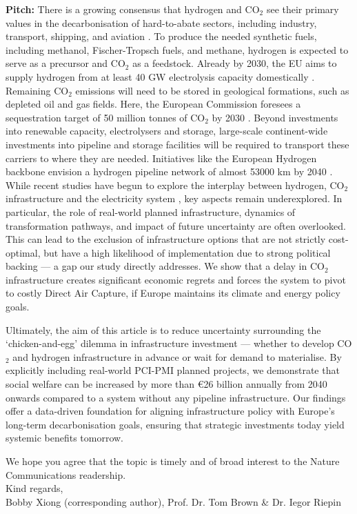 \documentclass[10pt,a4paper,roman]{moderncv}        %
\begin{document}
\textbf{Pitch:} 
There is a growing consensus that hydrogen and CO$_2$ see their primary values in the decarbonisation of hard-to-abate sectors, including industry, transport, shipping, and aviation \cite{vangreevenbroekLittleLoseCase2025,reigstadMovingLowcarbonHydrogen2022,cerniauskasOptionsNaturalGas2020}. To produce the needed synthetic fuels, including methanol, Fischer-Tropsch fuels, and methane, hydrogen is expected to serve as a precursor and CO$_2$ as a feedstock. Already by 2030, the EU aims to supply hydrogen from at least 40 GW electrolysis capacity domestically \cite{europeancommissionCommunicationCommissionEuropean2020,europeancommissionREPowerEUPlanCommunication2022,europeanparliamentRegulationEU20242024}. Remaining CO$_2$ emissions will need to be stored in geological formations, such as depleted oil and gas fields. Here, the European Commission foresees a sequestration target of 50 million tonnes of CO$_2$ by 2030 \cite{europeancommissionREPowerEUPlanCommunication2022}. Beyond investments into renewable capacity, electrolysers and storage, large-scale continent-wide investments into pipeline and storage facilities will be required to transport these carriers to where they are needed. Initiatives like the European Hydrogen backbone envision a hydrogen pipeline network of almost 53000 km by 2040 \cite{europeanhydrogenbackboneinitiativeEuropeanHydrogenBackbone2022}. While recent studies have begun to explore the interplay between hydrogen, CO$_2$ infrastructure and the electricity system \cite{hofmannH2CO2Network2025,kountourisUnifiedEuropeanHydrogen2024,neumannPotentialRoleHydrogen2023,neumannGreenEnergySteel2025}, key aspects remain underexplored. In particular, the role of real-world planned infrastructure, dynamics of transformation pathways, and impact of future uncertainty are often overlooked. This can lead to the exclusion of infrastructure options that are not strictly cost-optimal, but have a high likelihood of implementation due to strong political backing \cite{trutnevyteDoesCostOptimization2016} --- a gap our study directly addresses. We show that a delay in CO$_2$ infrastructure creates significant economic regrets and forces the system to pivot to costly Direct Air Capture, if Europe maintains its climate and energy policy goals.

Ultimately, the aim of this article is to reduce uncertainty surrounding the `chicken-and-egg' dilemma in infrastructure investment --- whether to develop CO$_2$ and hydrogen infrastructure in advance or wait for demand to materialise. By explicitly including real-world PCI-PMI planned projects, we demonstrate that social welfare can be increased by more than €26 billion annually from 2040 onwards compared to a system without any pipeline infrastructure. Our findings offer a data-driven foundation for aligning infrastructure policy with Europe's long-term decarbonisation goals, ensuring that strategic investments today yield systemic benefits tomorrow.

We hope you agree that the topic is timely and of broad interest to the Nature Communications readership.\\

Kind regards,\\
Bobby Xiong (corresponding author), Prof. Dr. Tom Brown \& Dr. Iegor Riepin

\newpage


\end{document}
